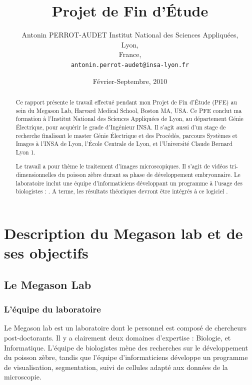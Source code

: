 




\title{Projet de Fin d'Étude} 
\author{Antonin PERROT-AUDET
  Institut National des Sciences Appliquées,\\
  Lyon,\\
  France,\\
  \texttt{antonin.perrot-audet@insa-lyon.fr}}   
\date{Février-Septembre, 2010} 
\maketitle


\begin{abstract}
  Ce rapport présente le travail effectué pendant mon Projet de Fin d'Étude (PFE) au sein du Megason Lab, Harvard Medical School, Boston MA, USA. Ce PFE conclut ma formation à l'Institut National des Sciences Appliquées de Lyon, au département Génie Électrique, pour acquérir le grade d'Ingénieur INSA. Il s'agit aussi d'un stage de recherche finalisant le master Génie Électrique et des Procédés, parcours Systèmes et Images à l'INSA de Lyon, l'École Centrale de Lyon, et l'Université Claude Bernard Lyon 1.

  Le travail a pour thème le traitement d'images microscopiques. Il s'agit de vidéos tri-dimensionnelles du poisson zèbre durant sa phase de développement embryonnaire. Le laboratoire inclut une équipe d'informaticiens développant un programme à l'usage des biologistes : {\gofigure}\cite{refGofigure2}. A terme, les résultats théoriques devront être intégrés à ce logiciel .
  
  
\tableofcontents  
  
 
\end{abstract}


\chapter{Description du Megason lab et de ses objectifs} 
{} 

\section{Le Megason Lab}

\subsection{L'équipe du laboratoire}
Le Megason lab est un laboratoire dont le personnel est composé de chercheurs post-doctorants.
Il y a clairement deux domaines d'expertise : Biologie, et Informatique.
L'équipe de biologistes mène des recherches sur le développement du poisson zèbre,
tandis que l'équipe d'informaticiens développe un programme de visualisation,
segmentation, suivi de cellules adapté aux données de la microscopie.

